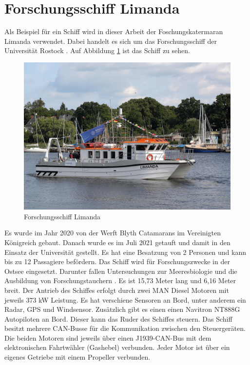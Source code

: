 \section{Forschungsschiff Limanda}
Als Beispiel für ein Schiff wird in dieser Arbeit der Foschungskatermaran Limanda verwendet. Dabei handelt es sich um das 
Forschungsschiff der Universität Rostock \cite{limanda}. Auf Abbildung \ref{fig:limanda} ist das Schiff zu sehen. 
\begin{figure}[H]
    \centering
    \includegraphics[scale=0.6]{images/limanda.jpg}
    \caption{Forschungsschiff Limanda \cite{limanda}}
    \label{fig:limanda}
\end{figure} 
Es wurde im Jahr 2020 von der Werft Blyth Catamarans im Vereinigten Königreich gebaut.
Danach wurde es im Juli 2021 getauft und damit in den Einsatz der Universität gestellt. 
Es hat eine Besatzung von 2 Personen und kann bis zu 12 Passagiere befördern.
Das Schiff wird für Forschungszwecke 
in der Ostsee eingesetzt. Darunter fallen Untersuchungen zur Meeresbiologie und die Ausbildung von 
Forschungstauchern \cite{flyerLimanda}.
Es ist 15,73 Meter lang und 6,16 Meter breit. Der Antrieb des Schiffes erfolgt durch zwei MAN Diesel Motoren mit jeweils 373 kW Leistung.
Es hat verschiene Sensoren an Bord, unter anderem ein Radar, GPS und Windsensor. Zusätzlich gibt es einen einen 
Navitron NT888G Autopiloten an Bord. Dieser kann das Ruder des Schiffes steuern.
Das Schiff besitzt mehrere CAN-Busse für die Kommunikation zwischen den Steuergeräten. Die beiden Motoren 
sind jeweils über einen J1939-CAN-Bus mit dem elektronischen Fahrtwähler (Gashebel) verbunden. Jeder Motor ist über 
ein eigenes Getriebe mit einem Propeller verbunden.

